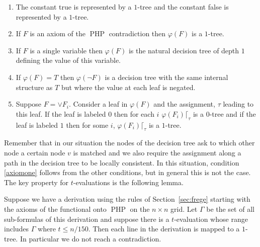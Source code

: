\documentclass{theoretics}
\DeclareMathOperator{\PHP}{PHP}
\begin{document}
\begin{enumerate}

\item The constant true is represented by a $1$-tree and the
constant false is represented by a $1$-tree.

\item If $F$ is an axiom of the $\PHP$ \label{axiomone}
contradiction then $\varphi(F)$ is a $1$-tree.

\item If $F$ is a single variable then
$\varphi(F)$ is the natural decision tree of depth $1$ defining
the value of this variable.

\item If $\varphi(F)=T$ then $\varphi(\neg F)$
is a decision tree with the same internal structure as $T$
but where the value at each leaf is negated.

\item Suppose $F= \lor F_i$. \label{rule:or}
Consider a leaf in $\varphi (F)$ and the assignment, $\tau$ leading to this
leaf.  If the leaf is labeled $0$ then for each $i$ 
$\varphi(F_i) \lceil_\tau$ is a $0$-tree and if the leaf is
labeled $1$ then for some $i$, $\varphi(F_i) \lceil_\tau$ is a $1$-tree.

\end{enumerate}

Remember that in our situation the nodes of the decision tree 
ask to which other node a certain node $v$ is matched and we
also require the assignment along a path in the decision tree
to be locally consistent. In this situation,  
condition \ref{axiomone} follows from
the other conditions, but in general this is not the case.
The key property for $t$-evaluations is the following
lemma.

\begin{lemma}\label{lemma:noproof}
Suppose we have a derivation using the rules
of Section~\ref{sec:frege} starting with the
axioms of the functional onto $\PHP$ on the $n \times n$ grid.
Let $\Gamma$ be the set of all sub-formulas of this derivation
and suppose  there is a $t$-evaluation whose range includes $\Gamma$ where
$ t \leq n/150$. 
Then each line in the derivation is mapped to a $1$-tree.
In particular we do not reach a contradiction.
\end{lemma}
\end{document}
